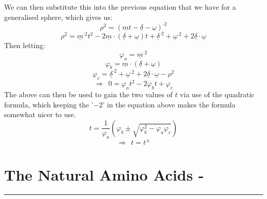 \documentclass[a4paper,10pt]{article}
\begin{document}
We can then substitute this into the previous equation that we have for a generalised sphere, which gives us:
\begin{equation}
\rho^2 = (\underline{m} t - \underline{\delta} - \underline{\omega})^{\cdot 2}
\end{equation}
\begin{equation}
	\rho^2 = \underline{m}^{\cdot 2} t^2 - 2  \underline{m} \cdot (\underline{\delta} + \underline{\omega}) t + \underline{\delta}^{\cdot 2} + \underline{\omega}^{\cdot 2} + 2 \underline{\delta} \cdot \underline{\omega}
\end{equation}
Then letting:
\begin{equation}
\varphi_a = \underline{m}^{\cdot 2}
\end{equation}
\begin{equation}
\varphi_b = \underline{m} \cdot (\underline{\delta} + \underline{\omega})
\end{equation}
\begin{equation}
\varphi_c = \underline{\delta}^{\cdot 2} + \underline{\omega}^{\cdot 2} + 2 \underline{\delta} \cdot \underline{\omega} - \rho^2
\end{equation}
\begin{equation}
\Rightarrow \ \ 0 = \varphi_a t^2 - 2\varphi_b t + \varphi_c
\end{equation}
The above can then be used to gain the two values of $t$ via use of the quadratic formula, which keeping the '$-2$' in the equation above makes the formula somewhat nicer to use.
\begin{equation}
t = \frac{1}{\varphi_a} \left(\varphi_b \pm \sqrt{\varphi_b^2 - \varphi_a \varphi_c} \right)
\end{equation}
$$ \Rightarrow \ \ t = t^\pm $$
\newpage
\section{The Natural Amino Acids -}
\rule{\textwidth}{1pt}
\end{document}
